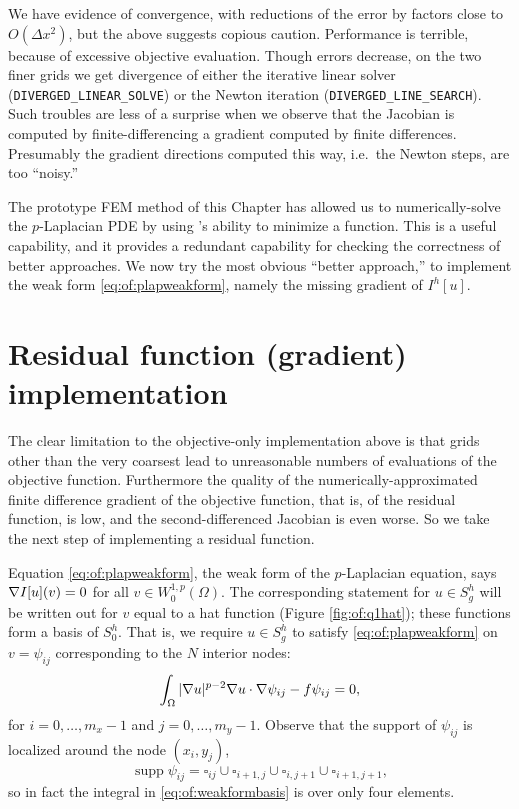 We have evidence of convergence, with reductions of the error by factors close to $O(\Delta x^2)$, but the above suggests copious caution.  Performance is terrible, because of excessive objective evaluation.  Though errors decrease, on the two finer grids we get divergence of either the iterative linear solver (\texttt{DIVERGED\_LINEAR\_SOLVE}) or the Newton iteration (\texttt{DIVERGED\_LINE\_SEARCH}).  Such troubles are less of a surprise when we observe that the Jacobian is computed by finite-differencing a gradient computed by finite differences.  Presumably the gradient directions computed this way, i.e.~the Newton steps, are too ``noisy.''

The prototype FEM method of this Chapter has allowed us to numerically-solve the $p$-Laplacian PDE by using \PETSc's ability to minimize a function.  This is a useful capability, and it provides a redundant capability for checking the correctness of better approaches.  We now try the most obvious ``better approach,'' to implement the weak form \eqref{eq:of:plapweakform}, namely the missing gradient of $I^h[u]$.


\section{Residual function (gradient) implementation}

The clear limitation to the objective-only implementation above is that grids other than the very coarsest lead to unreasonable numbers of evaluations of the objective function.  Furthermore the quality of the numerically-approximated finite difference gradient of the objective function, that is, of the residual function, is low, and the second-differenced Jacobian is even worse.  So we take the next step of implementing a residual function.

Equation \eqref{eq:of:plapweakform}, the weak form of the $p$-Laplacian equation, says $\nabla I[u](v) = 0$ for all $v\in W_0^{1,p}(\Omega)$.  The corresponding statement for $u\in S_g^h$ will be written out for $v$ equal to a hat function (Figure \ref{fig:of:q1hat}); these functions form a basis of $S_0^h$.  That is, we require $u\in S_g^h$ to satisfy \eqref{eq:of:plapweakform} on $v=\psi_{ij}$ corresponding to the $N$ interior nodes:
\begin{equation}
\int_\Omega |\nabla u|^{p-2} \nabla u \cdot \nabla \psi_{ij} - f \psi_{ij} = 0, \label{eq:of:weakformbasis}
\end{equation}
for $i=0,\dots,m_x-1$ and $j=0,\dots,m_y-1$.  Observe that the support of $\psi_{ij}$ is localized around the node $(x_i,y_j)$,
    $$\operatorname{supp} \psi_{ij} = \square_{ij} \cup \square_{i+1,j} \cup \square_{i,j+1} \cup \square_{i+1,j+1},$$
so in fact the integral in \eqref{eq:of:weakformbasis} is over only four elements.

